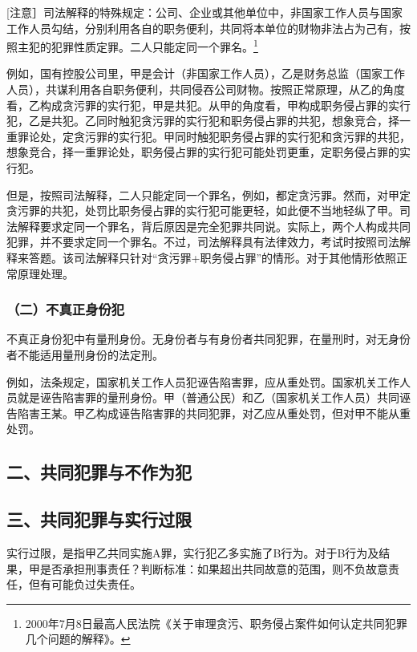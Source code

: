[注意］司法解释的特殊规定：公司、企业或其他单位中，非国家工作人员与国家工作人员勾结，分别利用各自的职务便利，共同将本单位的财物非法占为己有，按照主犯的犯罪性质定罪。二人只能定同一个罪名。\footnote{2000年7月8日最高人民法院《关于审理贪污、职务侵占案件如何认定共同犯罪几个问题的解释》。}

例如，国有控股公司里，甲是会计（非国家工作人员），乙是财务总监（国家工作人员），共谋利用各自职务便利，共同侵吞公司财物。按照正常原理，从乙的角度看，乙构成贪污罪的实行犯，甲是共犯。从甲的角度看，甲构成职务侵占罪的实行犯，乙是共犯。乙同时触犯贪污罪的实行犯和职务侵占罪的共犯，想象竞合，择一重罪论处，定贪污罪的实行犯。甲同时触犯职务侵占罪的实行犯和贪污罪的共犯，想象竞合，择一重罪论处，职务侵占罪的实行犯可能处罚更重，定职务侵占罪的实行犯。

但是，按照司法解释，二人只能定同一个罪名，例如，都定贪污罪。然而，对甲定贪污罪的共犯，处罚比职务侵占罪的实行犯可能更轻，如此便不当地轻纵了甲。司法解释要求定同一个罪名，背后原因是完全犯罪共同说。实际上，两个人构成共同犯罪，并不要求定同一个罪名。不过，司法解释具有法律效力，考试时按照司法解释来答题。该司法解释只针对“贪污罪+职务侵占罪”的情形。对于其他情形依照正常原理处理。

\subsubsection*{（二）不真正身份犯}

不真正身份犯中有量刑身份。无身份者与有身份者共同犯罪，在量刑时，对无身份者不能适用量刑身份的法定刑。

例如，法条规定，国家机关工作人员犯诬告陷害罪，应从重处罚。国家机关工作人员就是诬告陷害罪的量刑身份。甲（普通公民）和乙（国家机关工作人员）共同诬告陷害王某。甲乙构成诬告陷害罪的共同犯罪，对乙应从重处罚，但对甲不能从重处罚。

\subsection*{二、共同犯罪与不作为犯}



\subsection*{三、共同犯罪与实行过限}

实行过限，是指甲乙共同实施A罪，实行犯乙多实施了B行为。对于B行为及结果，甲是否承担刑事责任？判断标准：如果超出共同故意的范围，则不负故意责任，但有可能负过失责任。

